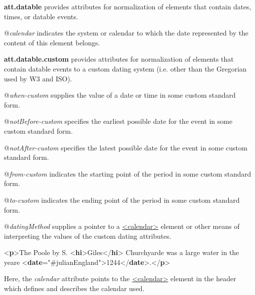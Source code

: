 \begin{sansreflist}
  
\item [\textbf{att.datable}] provides attributes for normalization of elements that contain dates, times, or datable events.\hfil\\[-10pt]\begin{sansreflist}
    \item[@{\itshape calendar}]
  indicates the system or calendar to which the date represented by the content of this element belongs.
\end{sansreflist}  
\item [\textbf{att.datable.custom}] provides attributes for normalization of elements that contain datable events to a custom dating system (i.e. other than the Gregorian used by W3 and ISO).\hfil\\[-10pt]\begin{sansreflist}
    \item[@{\itshape when-custom}]
  supplies the value of a date or time in some custom standard form.
    \item[@{\itshape notBefore-custom}]
  specifies the earliest possible date for the event in some custom standard form.
    \item[@{\itshape notAfter-custom}]
  specifies the latest possible date for the event in some custom standard form.
    \item[@{\itshape from-custom}]
  indicates the starting point of the period in some custom standard form.
    \item[@{\itshape to-custom}]
  indicates the ending point of the period in some custom standard form.
    \item[@{\itshape datingMethod}]
  supplies a pointer to a \hyperref[TEI.calendar]{<calendar>} element or other means of interpreting the values of the custom dating attributes.
\end{sansreflist}  
\end{sansreflist}
 \par\bgroup{}\exampleFont \begin{shaded}\noindent\mbox{}{<\textbf{p}>}The Poole by S. {<\textbf{hi}>}Giles{</\textbf{hi}>} Churchyarde was a large water in the yeare {<\textbf{date}\hspace*{1em}{calendar}="{\#julianEngland}">}1244{</\textbf{date}>}.{</\textbf{p}>}\end{shaded}\egroup\par \noindent  Here, the {\itshape calendar} attribute points to the \hyperref[TEI.calendar]{<calendar>} element in the header which defines and describes the calendar used.\par
